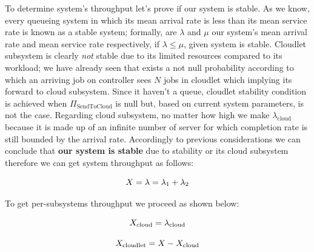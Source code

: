 \documentclass[10pt,a4paper]{article}
\begin{document}
To determine system's throughput let's prove if our system is stable.
As we know, every queueing system in which its mean arrival rate is less than its mean service rate is known as a stable system; formally, are $\lambda$ and $\mu$ our system's mean arrival rate and mean service rate respectively, if $\lambda \leq \mu$, given system is stable.
Cloudlet subsystem is clearly \textit{not} stable due to its limited resources compared to its workload; we have already seen that exists a not null probability according to which an arriving job on controller sees $N$ jobs in cloudlet which implying its forward to cloud subsystem. Since it haven't a queue, cloudlet stability condition is achieved when $\Pi_{\text{SendToCloud}}$ is null but, based on current system parameters, is not the case.
Regarding cloud subsystem, no matter how high we make $\lambda_{\text{cloud}}$ because it is made up of an infinite number of server for which completion rate is still bounded by the arrival rate.
Accordingly to previous considerations we can conclude that \textbf{our system is stable} due to stability or its cloud subsystem therefore we can get system throughput as follows:

\begin{equation}
X = \lambda = \lambda_1 + \lambda_2 \\
\end{equation}

To get per-subsystems throughput we proceed as shown below:

\begin{equation}
X_{\text{cloud}} = \lambda_{\text{cloud}} \\
\end{equation}

\begin{equation}
X_{\text{cloudlet}} = X - X_{\text{cloud}} \\
\end{equation}


\newpage
\end{document}
